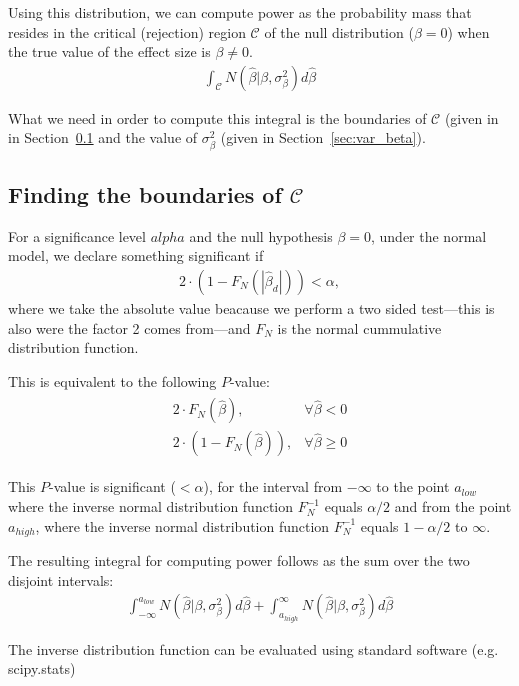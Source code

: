 \documentclass{scrartcl}
\begin{document}
Using this distribution, we can compute power as the probability mass that resides in the critical (rejection) region  $\mathcal{C}$ of the null distribution ($\beta=0$) when the true value of the effect size is $\beta\neq0$.
\begin{align}
\int_{\mathcal{C}} N(\hat\beta | \beta,\sigma_\beta^2) d \hat\beta
\end{align}

What we need in order to compute this integral is the boundaries of $\mathcal{C}$ (given in in Section~\ref{sec:critical_boundaries} and the value of $\sigma_\beta^2$ (given in Section~\ref{sec:var_beta}).
\subsection{Finding the boundaries of $\mathcal{C}$}
\label{sec:critical_boundaries}
For a significance level $alpha$ and the null hypothesis $\beta=0$, under the normal model, we declare something significant if
\begin{align}
2 \cdot (1-F_N(|\hat\beta_d|))<\alpha,
\end{align}
where we take the absolute value beacause we perform a two sided test---this is also were the factor 2 comes from---and $F_N$ is the normal cummulative distribution function.

This is equivalent to the following $P$-value:
\begin{align}
\begin{array}{lc}
2 \cdot F_N(\hat\beta), & \forall \hat\beta<0\\
2 \cdot (1-F_N(\hat\beta)), & \forall \hat\beta\geq0
\end{array}
\end{align}

This $P$-value is significant ($<\alpha$), for the interval from $-\infty$ to the point $a_{low}$ where the inverse normal distribution function $F_N^{-1}$ equals $\alpha/2$ and from the point $a_{high}$, where the inverse normal distribution function  $F_N^{-1}$ equals $1-\alpha/2$ to $\infty$.

The resulting integral for computing power follows as the sum over the two disjoint intervals:
\begin{align}
\int_{-\infty}^{a_{low}} N(\hat\beta | \beta,\sigma_\beta^2) d \hat\beta + \int_{a_{high}}^{\infty} N(\hat\beta | \beta,\sigma_\beta^2) d \hat\beta
\end{align}

The inverse distribution function can be evaluated using standard software (e.g. scipy.stats)
\end{document}
